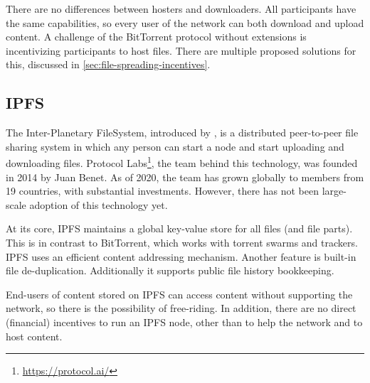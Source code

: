 

There are no differences between hosters and downloaders. All participants have the same capabilities, so every user of the network can both download and upload content. A challenge of the BitTorrent protocol without extensions is incentivizing participants to host files. There are multiple proposed solutions for this, discussed in \ref{sec:file-spreading-incentives}.

\subsection{IPFS}
The Inter-Planetary FileSystem, introduced by \cite{benet2014ipfs}, is a distributed peer-to-peer file sharing system in which any person can start a node and start uploading and downloading files. Protocol Labs\footnote{\url{https://protocol.ai/}}, the team behind this technology, was founded in 2014 by Juan Benet. As of 2020, the team has grown globally to members from 19 countries, with substantial investments. However, there has not been large-scale adoption of this technology yet.


At its core, IPFS maintains a global key-value store for all files (and file parts). This is in contrast to BitTorrent, which works with torrent swarms and trackers. IPFS uses an efficient content addressing mechanism. Another feature is built-in file de-duplication. Additionally it supports public file history bookkeeping.

End-users of content stored on IPFS can access content without supporting the network, so there is the possibility of free-riding. In addition, there are no direct (financial) incentives to run an IPFS node, other than to help the network and to host content. 
